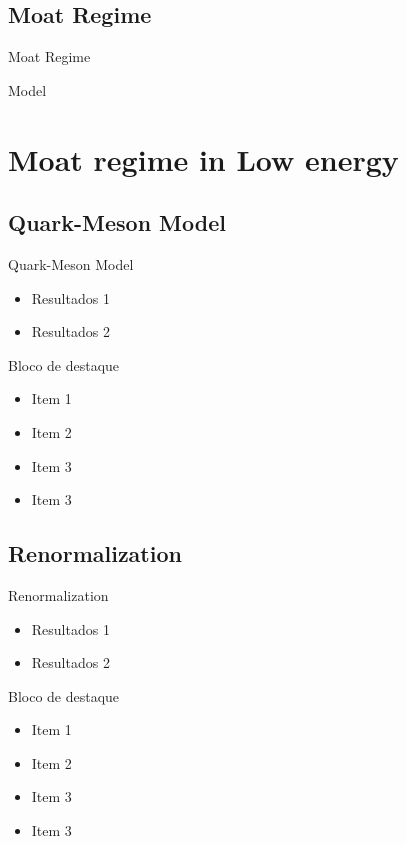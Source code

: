 \documentclass{if-beamer}
\begin{document}
\subsection{Moat Regime}
\begin{frame}{Moat Regime}

    Model

\end{frame}


\section{Moat regime in Low energy}

\subsection{Quark-Meson Model}
\begin{frame}{Quark-Meson Model}

\begin{itemize}
    \item Resultados 1
    \item Resultados 2
\end{itemize}

\begin{block}{Bloco de destaque}
    \begin{itemize}
        \item Item 1
        \item Item 2
        \item Item 3
        \item Item 3
    \end{itemize}
\end{block}

\end{frame}

\subsection{Renormalization}
\begin{frame}{Renormalization}

\begin{itemize}
    \item Resultados 1
    \item Resultados 2
\end{itemize}

\begin{block}{Bloco de destaque}
    \begin{itemize}
        \item Item 1
        \item Item 2
        \item Item 3
        \item Item 3
    \end{itemize}
\end{block}

\end{frame}
\end{document}
